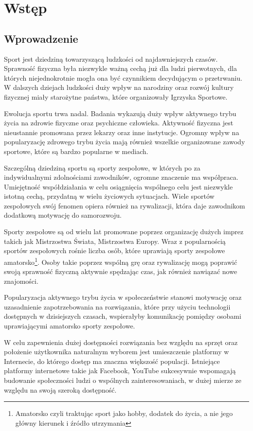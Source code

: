 \chapter{Wstęp}
\section{Wprowadzenie}

Sport jest dziedziną towarzyszącą ludzkości od najdawniejszych czasów. Sprawność fizyczna była niezwykle ważną cechą już dla ludzi pierwotnych, dla których niejednokrotnie mogła ona być czynnikiem decydującym o przetrwaniu. W dalszych dziejach ludzkości duży wpływ na narodziny oraz rozwój kultury fizycznej miały starożytne państwa, które organizowały Igrzyska Sportowe.

Ewolucja sportu trwa nadal. Badania wykazują duży wpływ aktywnego trybu życia na zdrowie fizyczne oraz psychiczne człowieka. Aktywność fizyczna jest nieustannie promowana przez lekarzy oraz inne instytucje. Ogromny wpływ na popularyzację zdrowego trybu życia mają również wszelkie organizowane zawody sportowe, które są bardzo popularne w mediach.

Szczególną dziedziną sportu są sporty zespołowe, w których po za indywidualnymi zdolnościami zawodników, ogromne znaczenie ma współpraca. Umiejętność współdziałania w celu osiągnięcia wspólnego celu jest niezwykle istotną cechą, przydatną w wielu życiowych sytuacjach. Wiele sportów zespołowych swój fenomen opiera również na rywalizacji, która daje zawodnikom dodatkową motywację do samorozwoju.

Sporty zespołowe są od wielu lat promowane poprzez organizację dużych imprez takich jak Mistrzostwa Świata, Mistrzostwa Europy. Wraz z popularnością sportów zespołowych rośnie liczba osób, które uprawiają sporty zespołowe amatorsko\footnote{Amatorsko czyli traktując sport jako hobby, dodatek do życia, a nie jego główny kierunek i źródło utrzymania}. Osoby takie poprzez wspólną grę oraz rywalizację mogą poprawić swoją sprawność fizyczną aktywnie spędzając czas, jak również nawiązać nowe znajomości.

Popularyzacja aktywnego trybu życia w społeczeństwie stanowi motywację oraz uzasadnienie zapotrzebowania na rozwiązania, które przy użyciu technologii dostępnych w dzisiejszych czasach, wspierałyby komunikację pomiędzy osobami uprawiającymi amatorsko sporty zespołowe. 

W celu zapewnienia dużej dostępności rozwiązania bez względu na sprzęt oraz położenie użytkownika naturalnym wyborem jest umieszczenie platformy w Internecie, do którego dostęp ma znaczna większość populacji. Istniejące platformy internetowe takie jak Facebook, YouTube sukcesywnie wspomagają budowanie społeczności ludzi o wspólnych zainteresowaniach, w dużej mierze ze względu na swoją szeroką dostępność.

